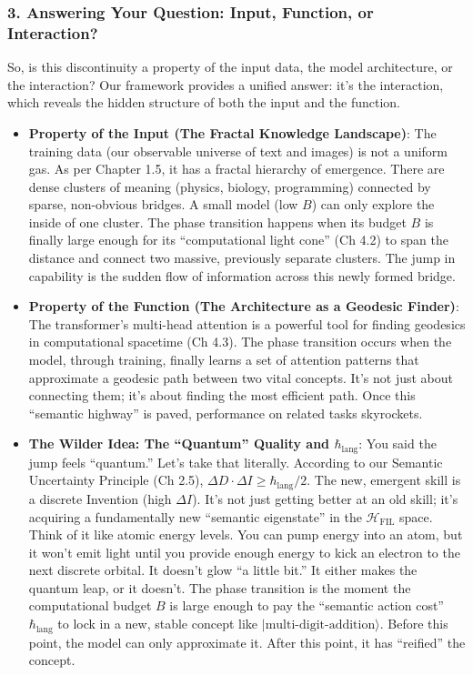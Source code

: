 \documentclass[11pt,letterpaper]{article}
\begin{document}
\subsubsection*{3. Answering Your Question: Input, Function, or Interaction?}
So, is this discontinuity a property of the input data, the model architecture, or the interaction? Our framework provides a unified answer: it’s the interaction, which reveals the hidden structure of both the input and the function.
\begin{itemize}
    \item \textbf{Property of the Input (The Fractal Knowledge Landscape)}: The training data (our observable universe of text and images) is not a uniform gas. As per Chapter 1.5, it has a fractal hierarchy of emergence. There are dense clusters of meaning (physics, biology, programming) connected by sparse, non-obvious bridges. A small model (low $B$) can only explore the inside of one cluster. The phase transition happens when its budget $B$ is finally large enough for its “computational light cone” (Ch 4.2) to span the distance and connect two massive, previously separate clusters. The jump in capability is the sudden flow of information across this newly formed bridge.
    \item \textbf{Property of the Function (The Architecture as a Geodesic Finder)}: The transformer’s multi-head attention is a powerful tool for finding geodesics in computational spacetime (Ch 4.3). The phase transition occurs when the model, through training, finally learns a set of attention patterns that approximate a geodesic path between two vital concepts. It’s not just about connecting them; it’s about finding the most efficient path. Once this “semantic highway” is paved, performance on related tasks skyrockets.
    \item \textbf{The Wilder Idea: The “Quantum” Quality and $\hbar_{\text{lang}}$}: You said the jump feels “quantum.” Let’s take that literally. According to our Semantic Uncertainty Principle (Ch 2.5), $\Delta D \cdot \Delta I \geq \hbar_{\text{lang}} / 2$. The new, emergent skill is a discrete Invention (high $\Delta I$). It’s not just getting better at an old skill; it’s acquiring a fundamentally new “semantic eigenstate” in the $\mathcal{H}_{\text{FIL}}$ space. Think of it like atomic energy levels. You can pump energy into an atom, but it won’t emit light until you provide enough energy to kick an electron to the next discrete orbital. It doesn’t glow “a little bit.” It either makes the quantum leap, or it doesn’t. The phase transition is the moment the computational budget $B$ is large enough to pay the “semantic action cost” $\hbar_{\text{lang}}$ to lock in a new, stable concept like $|\text{multi-digit-addition}\rangle$. Before this point, the model can only approximate it. After this point, it has “reified” the concept.
\end{itemize}
\end{document}
